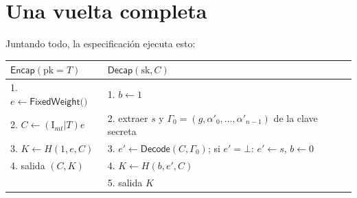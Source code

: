 \documentclass[11pt,a4paper,oneside]{report}
\begin{document}
\section{Una vuelta completa}

Juntando todo, la especificación ejecuta esto:

\begin{center}
\small
\begin{tabular}{p{6.6cm}p{6.6cm}}
\toprule
$\textsf{Encap}(\mathrm{pk}=T)$ & $\textsf{Decap}(\mathrm{sk},C)$\\
\midrule
1. $e\leftarrow\textsf{FixedWeight()}$ &
  1. $b\leftarrow1$\\
2. $C\leftarrow(\mathrm{I}_{mt}|T)e$ &
  2. extraer $s$ y $\Gamma_0=(g,\alpha'_0,\dots,\alpha'_{n-1})$
    de la clave secreta\\
3. $K\leftarrow H(1,e,C)$ &
  3. $e'\leftarrow\textsf{Decode}(C,\Gamma_0)$;\newline
    si $e'=\bot$: $e'\leftarrow s$, $b\leftarrow0$\\
4. salida $(C,K)$ &
  4. $K\leftarrow H(b,e',C)$\\
 & 5. salida $K$\\
\bottomrule
\end{tabular}
\end{center}
\end{document}
